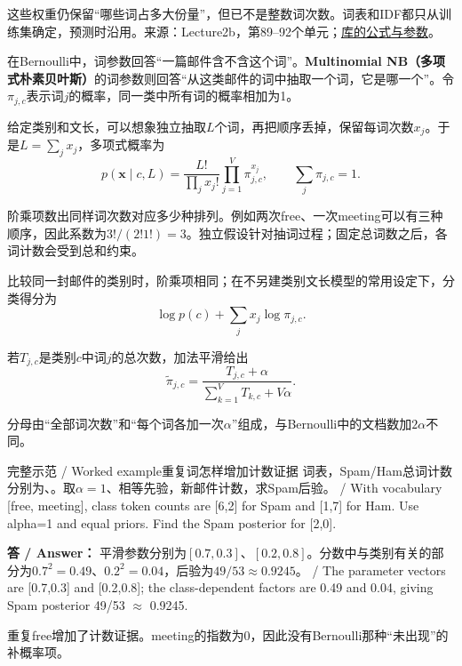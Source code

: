 这些权重仍保留“哪些词占多大份量”，但已不是整数词次数。词表和IDF都只从训练集确定，预测时沿用。来源：Lecture2b，第89–92个单元；\href{https://scikit-learn.org/stable/modules/generated/sklearn.feature\_extraction.text.TfidfTransformer.html}{库的公式与参数}。








在Bernoulli中，词参数回答“一篇邮件含不含这个词”。\textbf{Multinomial NB（多项式朴素贝叶斯）}的词参数则回答“从这类邮件的词中抽取一个词，它是哪一个”。令\(\pi_{j,c}\)表示词\(j\)的概率，同一类中所有词的概率相加为1。


给定类别和文长，可以想象独立抽取\(L\)个词，再把顺序丢掉，保留每词次数\(x_j\)。于是\(L=\sum_jx_j\)，多项式概率为
\[
p(\mathbf x\mid c,L)=\frac{L!}{\prod_jx_j!}\prod_{j=1}^V\pi_{j,c}^{x_j},\qquad
\sum_j\pi_{j,c}=1.
\tag{2.32}
\]


阶乘项数出同样词次数对应多少种排列。例如两次free、一次meeting可以有三种顺序，因此系数为\(3!/(2!1!)=3\)。独立假设针对抽词过程；固定总词数之后，各词计数会受到总和约束。


比较同一封邮件的类别时，阶乘项相同；在不另建类别文长模型的常用设定下，分类得分为
\[
\log p(c)+\sum_jx_j\log\pi_{j,c}.
\tag{2.33}
\]


若\(T_{j,c}\)是类别\(c\)中词\(j\)的总次数，加法平滑给出
\[
\tilde\pi_{j,c}=\frac{T_{j,c}+\alpha}{\sum_{k=1}^VT_{k,c}+V\alpha}.
\tag{2.34}
\]


分母由“全部词次数”和“每个词各加一次\(\alpha\)”组成，与Bernoulli中的文档数加\(2\alpha\)不同。


\begin{StudyBlock}{完整示范 / Worked example}{重复词怎样增加计数证据}
词表，Spam/Ham总词计数分别为\StudyInline{[6,\allowbreak{}2]}、\StudyInline{[1,\allowbreak{}7]}。取\(\alpha=1\)、相等先验，新邮件计数\StudyInline{[2,\allowbreak{}0]}，求Spam后验。 / With vocabulary [free, meeting], class token counts are [6,2] for Spam and [1,7] for Ham. Use alpha=1 and equal priors. Find the Spam posterior for [2,0].


\textbf{答 / Answer：} 平滑参数分别为\([0.7,0.3]\)、\([0.2,0.8]\)。分数中与类别有关的部分为\(0.7^2=0.49\)、\(0.2^2=0.04\)，后验为\(49/53\approx0.9245\)。 / The parameter vectors are [0.7,0.3] and [0.2,0.8]; the class-dependent factors are 0.49 and 0.04, giving Spam posterior 49/53 \ensuremath{\approx} 0.9245.


重复free增加了计数证据。meeting的指数为0，因此没有Bernoulli那种“未出现”的补概率项。
\end{StudyBlock}

